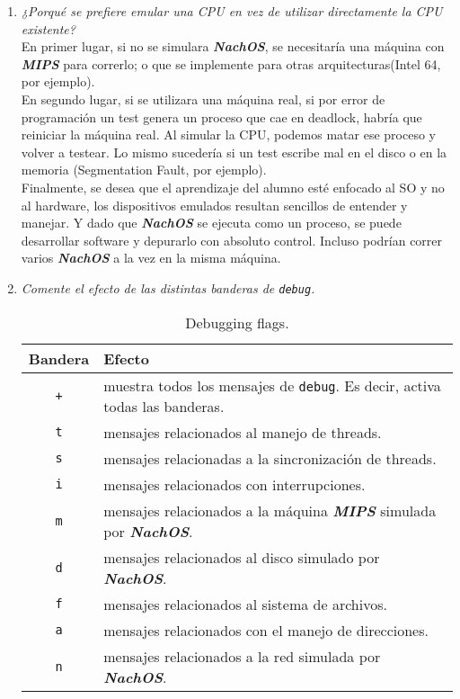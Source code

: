 \begin{enumerate}
\item \textit{¿Porqué se prefiere emular una CPU en vez de utilizar directamente la CPU existente?}\\
En primer lugar, si no se simulara \textbf{\textit{NachOS}}, se necesitaría una máquina con \textbf{\textit{MIPS}} para correrlo; o que se implemente para otras arquitecturas(Intel 64, por ejemplo).\\
En segundo lugar, si se utilizara una máquina real, si por error de programación un test genera un proceso que cae en deadlock, habría que reiniciar la máquina real. Al simular la CPU, podemos matar ese proceso y volver a testear. Lo mismo sucedería si un test escribe mal en el disco o en la memoria (Segmentation Fault, por ejemplo).\\
Finalmente, se desea que el aprendizaje del alumno esté enfocado al SO y no al hardware, los dispositivos emulados resultan sencillos de entender y manejar. Y dado que \textbf{\textit{NachOS}} se ejecuta como un proceso, se puede desarrollar software y depurarlo con absoluto control. Incluso podrían correr varios \textbf{\textit{NachOS}} a la vez en la misma máquina.\\


\item \textit{Comente el efecto de las distintas banderas de \texttt{debug}.}

\begin{table}[hb]
	\center
    \begin{tabular}{|c|l|}
\hline
Bandera & Efecto \\
\hline
\texttt{+} & muestra todos los mensajes de \texttt{debug}. Es decir, activa todas las banderas. \\
\texttt{t} & mensajes relacionados al manejo de threads.    \\
\texttt{s} & mensajes relacionadas a la sincronización de threads.    \\
\texttt{i} & mensajes relacionados con interrupciones.\\
\texttt{m} & mensajes relacionados a la máquina \textbf{\textit{MIPS}} simulada por \textbf{\textit{NachOS}}.  \\
\texttt{d} & mensajes relacionados al disco simulado por \textbf{\textit{NachOS}}.    \\
\texttt{f} & mensajes relacionados al sistema de archivos.    \\
\texttt{a} & mensajes relacionados con el manejo de direcciones.\\
\texttt{n} & mensajes relacionados a la red simulada por \textbf{\textit{NachOS}}.\\
\hline
    \end{tabular}
    \caption{Debugging flags.}
    \label{debugging_flags}
\end{table}


\end{enumerate}
